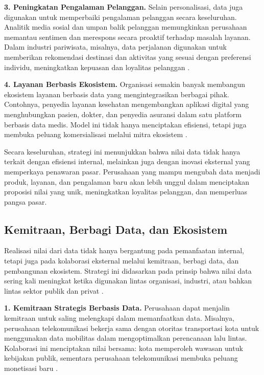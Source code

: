 \textbf{3. Peningkatan Pengalaman Pelanggan.}  
Selain personalisasi, data juga digunakan untuk memperbaiki pengalaman pelanggan secara keseluruhan. Analitik media sosial dan umpan balik pelanggan memungkinkan perusahaan memantau sentimen dan merespons secara proaktif terhadap masalah layanan. Dalam industri pariwisata, misalnya, data perjalanan digunakan untuk memberikan rekomendasi destinasi dan aktivitas yang sesuai dengan preferensi individu, meningkatkan kepuasan dan loyalitas pelanggan \cite{mariani2021}.

\textbf{4. Layanan Berbasis Ekosistem.}  
Organisasi semakin banyak membangun ekosistem layanan berbasis data yang mengintegrasikan berbagai pihak. Contohnya, penyedia layanan kesehatan mengembangkan aplikasi digital yang menghubungkan pasien, dokter, dan penyedia asuransi dalam satu platform berbasis data medis. Model ini tidak hanya menciptakan efisiensi, tetapi juga membuka peluang komersialisasi melalui mitra ekosistem \cite{ristevski2018}.

Secara keseluruhan, strategi ini menunjukkan bahwa nilai data tidak hanya terkait dengan efisiensi internal, melainkan juga dengan inovasi eksternal yang memperkaya penawaran pasar. Perusahaan yang mampu mengubah data menjadi produk, layanan, dan pengalaman baru akan lebih unggul dalam menciptakan proposisi nilai yang unik, meningkatkan loyalitas pelanggan, dan memperluas pangsa pasar.

\subsection{Kemitraan, Berbagi Data, dan Ekosistem}

Realisasi nilai dari data tidak hanya bergantung pada pemanfaatan internal, tetapi juga pada kolaborasi eksternal melalui kemitraan, berbagi data, dan pembangunan ekosistem. Strategi ini didasarkan pada prinsip bahwa nilai data sering kali meningkat ketika digunakan lintas organisasi, industri, atau bahkan lintas sektor publik dan privat \cite{georgescu2020, ekambaram2021}.

\textbf{1. Kemitraan Strategis Berbasis Data.}  
Perusahaan dapat menjalin kemitraan untuk saling melengkapi dalam memanfaatkan data. Misalnya, perusahaan telekomunikasi bekerja sama dengan otoritas transportasi kota untuk menggunakan data mobilitas dalam mengoptimalkan perencanaan lalu lintas. Kolaborasi ini menciptakan nilai bersama: kota memperoleh wawasan untuk kebijakan publik, sementara perusahaan telekomunikasi membuka peluang monetisasi baru \cite{zheng2016}.

